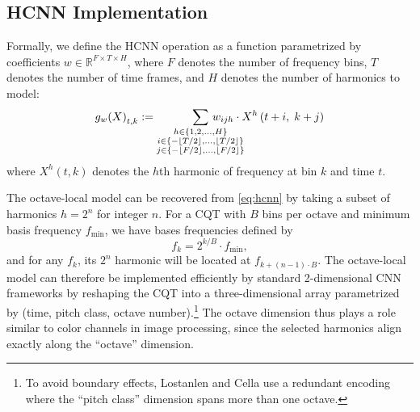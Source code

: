 \documentclass{article}
\begin{document}
\subsection{HCNN Implementation}

Formally, we define the HCNN operation as a function parametrized by coefficients $w \in \mathbb{R}^{F \times T \times H}$, where $F$ denotes the number of frequency bins, $T$ denotes the number of time frames, and $H$ denotes the number of harmonics to model:
\begin{equation}
    {g_w(X)}_{t, k} := 
    \sum_{\substack{%
        h \in \{1, 2, \ldots, H\}\\
        i \in \{-\lfloor T/2\rfloor, \ldots, \lfloor T/2 \rfloor\}\\
        j \in \{-\lfloor F/2\rfloor, \ldots, \lfloor F/2 \rfloor\}}
    }
    \hspace{-3em}%
    w_{ijh} \cdot X^h\left(t + i,\; k + j\right)\label{eq:hcnn}
\end{equation}
where $X^h(t, k)$ denotes the $h$th harmonic of frequency at bin $k$ and time $t$.

The octave-local model can be recovered from \cref{eq:hcnn} by taking a subset of harmonics $h=2^n$ for integer $n$.
For a CQT with $B$ bins per octave and minimum basis frequency $f_{\min}$, we have bases frequencies defined by
\begin{equation}
    f_k = 2^{k/B} \cdot f_{\min}, \label{eq:cqtfreqs}
\end{equation}
and for any $f_k$, its $2^n$ harmonic will be located at $f_{k + (n-1)\cdot B}$.
The octave-local model can therefore be implemented efficiently by standard 2-dimensional CNN frameworks by reshaping the CQT into a three-dimensional array parametrized by (time, pitch class, octave number).\footnote{To avoid boundary effects, Lostanlen and Cella use a redundant encoding where the ``pitch class'' dimension spans more than one octave.}
The octave dimension thus plays a role similar to color channels in image processing, since the selected harmonics align exactly along the ``octave'' dimension.

\end{document}

